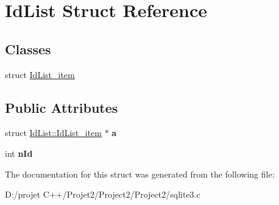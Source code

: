 \hypertarget{struct_id_list}{}\section{Id\+List Struct Reference}
\label{struct_id_list}
\subsection*{Classes}
\begin{DoxyCompactItemize}
\item 
struct \mbox{\hyperlink{struct_id_list_1_1_id_list__item}{Id\+List\+\_\+item}}
\end{DoxyCompactItemize}
\subsection*{Public Attributes}
\begin{DoxyCompactItemize}
\item 
\mbox{\label{struct_id_list_ad33082fd71286c1159711a1a3e979763}} 
struct \mbox{\hyperlink{struct_id_list_1_1_id_list__item}{Id\+List\+::\+Id\+List\+\_\+item}} $\ast$ {\bfseries a}
\item 
\mbox{\label{struct_id_list_afb785717796d8b3c72d1ae682dcb6ff0}} 
int {\bfseries n\+Id}
\end{DoxyCompactItemize}


The documentation for this struct was generated from the following file\+:\begin{DoxyCompactItemize}
\item 
D\+:/projet C++/\+Projet2/\+Project2/\+Project2/sqlite3.\+c\end{DoxyCompactItemize}
